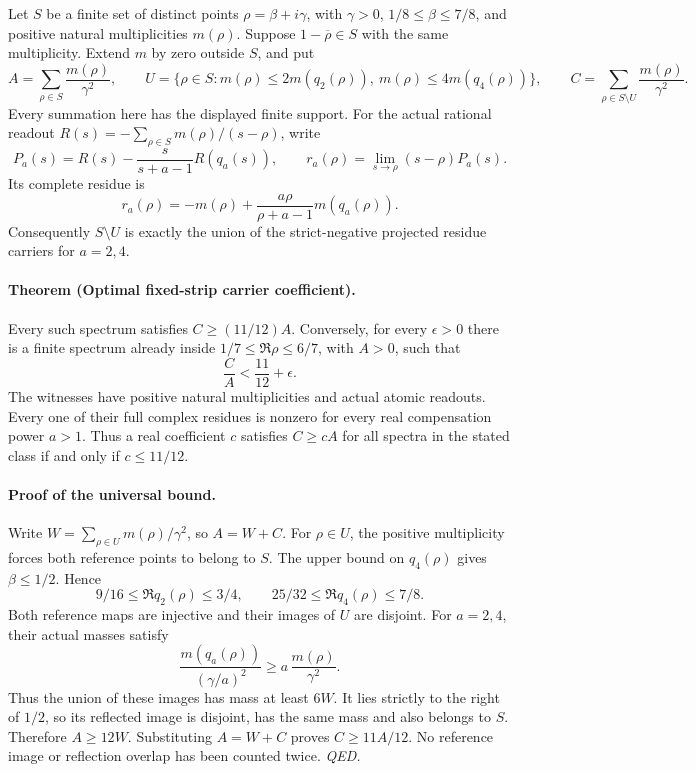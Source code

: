 Let \(S\) be a finite set of distinct points \(\rho=\beta+i\gamma\), with
\(\gamma>0\), \(1/8\le\beta\le7/8\), and positive natural multiplicities
\(m(\rho)\). Suppose \(1-\overline\rho\in S\) with the same multiplicity.
Extend \(m\) by zero outside \(S\), and put
\[
 A=\sum_{\rho\in S}\frac{m(\rho)}{\gamma^2},\qquad
 U=\{\rho\in S:m(\rho)\le2m(q_2(\rho)),\
                       m(\rho)\le4m(q_4(\rho))\},
 \qquad C=\sum_{\rho\in S\setminus U}\frac{m(\rho)}{\gamma^2}.
\]
Every summation here has the displayed finite support. For the actual
rational readout \(R(s)=-\sum_{\rho\in S}m(\rho)/(s-\rho)\), write
\[
 P_a(s)=R(s)-\frac{s}{s+a-1}R(q_a(s)),\qquad
 r_a(\rho)=\lim_{s\to\rho}(s-\rho)P_a(s).
\]
Its complete residue is
\[
 r_a(\rho)=-m(\rho)+\frac{a\rho}{\rho+a-1}m(q_a(\rho)).
\]
Consequently \(S\setminus U\) is exactly the union of the strict-negative
projected residue carriers for \(a=2,4\).

\paragraph{Theorem (Optimal fixed-strip carrier coefficient).}
\label{thm:dyadic-fixed-strip-optimality}
Every such spectrum satisfies \(C\ge(11/12)A\).
Conversely, for every \(\epsilon>0\) there is a finite spectrum already
inside \(1/7\le\Re\rho\le6/7\), with \(A>0\), such that
\[
 \frac CA<\frac{11}{12}+\epsilon.
\]
The witnesses have positive natural multiplicities and actual atomic
readouts. Every one of their full complex residues is nonzero for every
real compensation power \(a>1\). Thus a real coefficient \(c\) satisfies
\(C\ge cA\) for all spectra in the stated class if and only if
\(c\le11/12\).

\paragraph{Proof of the universal bound.}
Write \(W=\sum_{\rho\in U}m(\rho)/\gamma^2\), so \(A=W+C\).
For \(\rho\in U\), the positive multiplicity forces both reference
points to belong to \(S\). The upper bound on \(q_4(\rho)\) gives
\(\beta\le1/2\). Hence
\[
 9/16\le\Re q_2(\rho)\le3/4,\qquad
 25/32\le\Re q_4(\rho)\le7/8.
\]
Both reference maps are injective and their images of \(U\) are disjoint.
For \(a=2,4\), their actual masses satisfy
\[
 \frac{m(q_a(\rho))}{(\gamma/a)^2}
 \ge a\,\frac{m(\rho)}{\gamma^2}.
\]
Thus the union of these images has mass at least \(6W\).
It lies strictly to the right of \(1/2\), so its reflected image is
disjoint, has the same mass and also belongs to \(S\).
Therefore \(A\ge12W\). Substituting \(A=W+C\) proves \(C\ge11A/12\).
No reference image or reflection overlap has been counted twice.
\hfill\textit{QED.}

